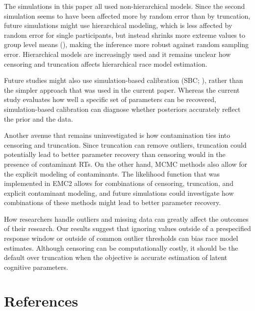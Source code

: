 \documentclass[
  man,
  floatsintext,
  longtable,
  nolmodern,
  notxfonts,
  notimes,
  colorlinks=true,linkcolor=blue,citecolor=blue,urlcolor=blue]{apa7}
\begin{document}
The simulations in this paper all used non-hierarchical models. Since
the second simulation seems to have been affected more by random error
than by truncation, future simulations might use hierarchical modeling,
which is less affected by random error for single participants, but
instead shrinks more extreme values to group level means
(), making the inference
more robust against random sampling error. Hierarchical models are
increasingly used and it remains unclear how censoring and truncation
affects hierarchical race model estimation.

Future studies might also use simulation-based calibration (SBC;
), rather than the simpler
approach that was used in the current paper. Whereas the current study
evaluates how well a specific set of parameters can be recovered,
simulation-based calibration can diagnose whether posteriors accurately
reflect the prior and the data.

Another avenue that remains uninvestigated is how contamination ties
into censoring and truncation. Since truncation can remove outliers,
truncation could potentially lead to better parameter recovery than
censoring would in the presence of contaminant RTs. On the other hand,
MCMC methods also allow for the explicit modeling of contaminants. The
likelihood function that was implemented in EMC2 allows for combinations
of censoring, truncation, and explicit contaminant modeling, and future
simulations could investigate how combinations of these methods might
lead to better parameter recovery.

How researchers handle outliers and missing data can greatly affect the
outcomes of their research. Our results suggest that ignoring values
outside of a prespecified response window or outside of common outlier
thresholds can bias race model estimates. Although censoring can be
computationally costly, it should be the default over truncation when
the objective is accurate estimation of latent cognitive parameters.

\newpage{}

\section{References}\label{references}
\end{document}
